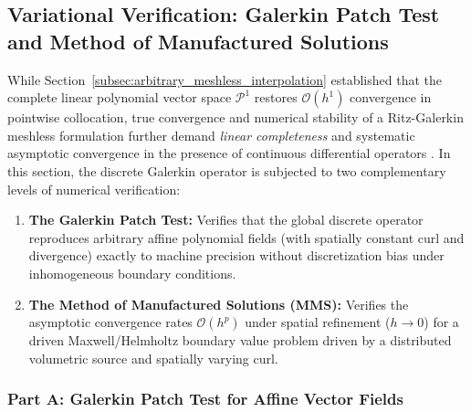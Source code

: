 \documentclass[preprint,12pt]{elsarticle}
\begin{document}
\subsection{Variational Verification: Galerkin Patch Test and Method of Manufactured Solutions}
\label{subsec:patch_test_galerkin}

While Section~\ref{subsec:arbitrary_meshless_interpolation} established that the complete linear polynomial vector space $\mathcal{P}^1$ restores $\mathcal{O}(h^1)$ convergence in pointwise collocation, true convergence and numerical stability of a Ritz-Galerkin meshless formulation further demand \emph{linear completeness} and systematic asymptotic convergence in the presence of continuous differential operators \cite{belytschko1994element,liu2009mesh}. In this section, the discrete Galerkin operator is subjected to two complementary levels of numerical verification:
\begin{enumerate}
    \item \textbf{The Galerkin Patch Test:} Verifies that the global discrete operator reproduces arbitrary affine polynomial fields (with spatially constant curl and divergence) exactly to machine precision without discretization bias under inhomogeneous boundary conditions.
    \item \textbf{The Method of Manufactured Solutions (MMS):} Verifies the asymptotic convergence rates $\mathcal{O}(h^p)$ under spatial refinement ($h \to 0$) for a driven Maxwell/Helmholtz boundary value problem driven by a distributed volumetric source and spatially varying curl.
\end{enumerate}

\subsubsection{Part A: Galerkin Patch Test for Affine Vector Fields}
\label{subsubsec:patch_test_affine}
\end{document}
